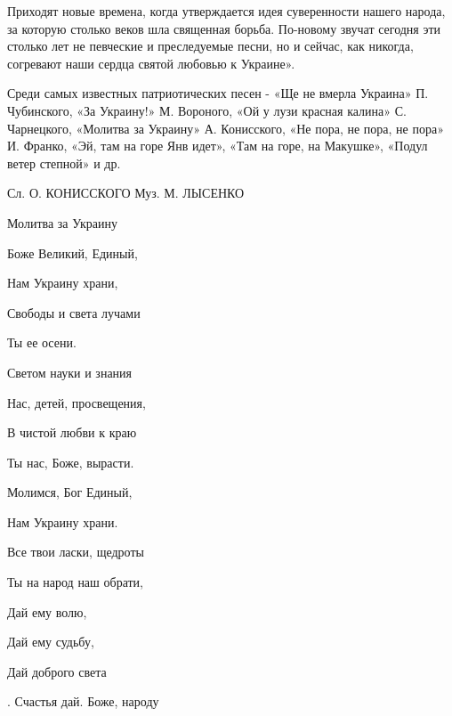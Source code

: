 Приходят новые времена, когда утверждается идея суверенности нашего народа, за которую столько веков шла священная борьба. По-новому звучат сегодня эти столько лет не певческие и преследуемые песни, но и сейчас, как никогда, согревают наши сердца святой любовью к Украине».



Среди самых известных патриотических песен - «Ще не вмерла Украина» П. Чубинского, «За Украину!» М. Вороного, «Ой у лузи красная калина» С. Чарнецкого, «Молитва за Украину» А. Конисского, «Не пора, не пора, не пора» И. Франко, «Эй, там на горе Янв идет», «Там на горе, на Макушке», «Подул ветер степной» и др.



Сл. О. КОНИССКОГО Муз. М. ЛЫСЕНКО



Молитва за Украину



Боже Великий, Единый,



Нам Украину храни,



Свободы и света лучами



Ты ее осени.



Светом науки и знания



Нас, детей, просвещения,



В чистой любви к краю



Ты нас, Боже, вырасти.



Молимся, Бог Единый,



Нам Украину храни.



Все твои ласки, щедроты



Ты на народ наш обрати,



Дай ему волю,



Дай ему судьбу,



Дай доброго света



. Счастья дай. Боже, народу



